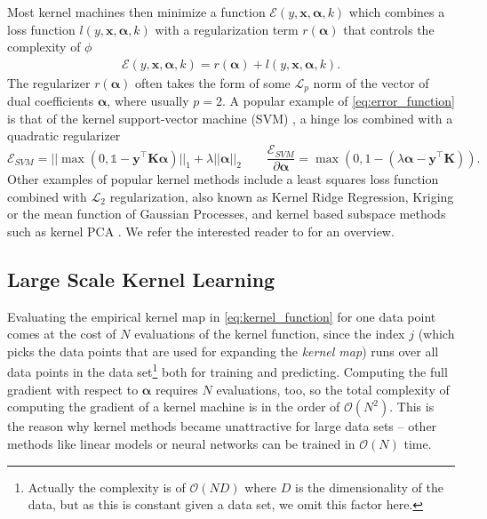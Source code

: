 \documentclass{article} %
\newcommand{\ones}{\ensuremath{\mathds{1}}}
\newcommand{\va}{\boldsymbol{\alpha}}
\newcommand{\Bx}{\mathbf{x}}
\renewcommand{\vec}[1]{\mathbf{#1}}
\begin{document}
Most kernel machines then minimize a function $\mathcal{E}(y, \Bx, \va, k)$ which combines a loss function $l(y, \Bx, \va, k)$ with a regularization term $r(\va)$ that controls the complexity of $\phi$ 
%
\begin{align}\label{eq:error_function}
\mathcal{E}(y, \Bx, \va, k) = r(\va) + l(y, \Bx, \va, k).
\end{align}
%
The regularizer $r(\va)$ often takes the form of some $\mathcal{L}_p$ norm of the vector of dual coefficients $\va$, where usually $p=2$. A popular example of \autoref{eq:error_function} is that of the kernel support-vector machine (SVM) \cite{Cortes1995}, a hinge los combined with a quadratic regularizer
%
\begin{equation}\label{eq:svm_gradient}
\mathcal{E}_{SVM} = ||\max \left(0,\ones-\vec{y}^{\top} \vec{K} \va \right)||_1 + \lambda ||\va||_2 \qquad \frac{\mathcal{E}_{SVM}}{\partial \va} =\max \left(0,1-\left(\lambda\va - \vec{y}^{\top}\vec{K}\right)\right).
\end{equation}
%
Other examples of popular kernel methods include a least squares loss function combined with $\mathcal{L}_2$ regularization, also known as Kernel Ridge Regression, Kriging \cite{kriging} or the mean function of Gaussian Processes, and kernel based subspace methods such as kernel PCA \cite{Scholkopf:1998p427}. We refer the interested reader to \cite{learning_with_kernels,shawe2004kernel} for an overview. 

\subsection{Large Scale Kernel Learning}\label{sec:large_scale_kernel_learning}
Evaluating the empirical kernel map in \autoref{eq:kernel_function} for one data point comes at the cost of $N$ evaluations of the kernel function, since the index $j$ (which picks the data points that are used for expanding the {\em kernel map}) runs over all data points in the data set\footnote{Actually the complexity is of $\mathcal{O}(ND)$ where $D$ is the dimensionality of the data, but as this is constant given a data set, we omit this factor here.} both for training and predicting. Computing the full gradient with respect to $\va$ requires $N$ evaluations, too, so the total complexity of computing the gradient of a kernel machine is in the order of $\mathcal{O}(N^2)$. This is the reason why kernel methods became unattractive for large data sets -- other methods like linear models or neural networks can be trained in $\mathcal{O}(N)$ time. 
\end{document}
